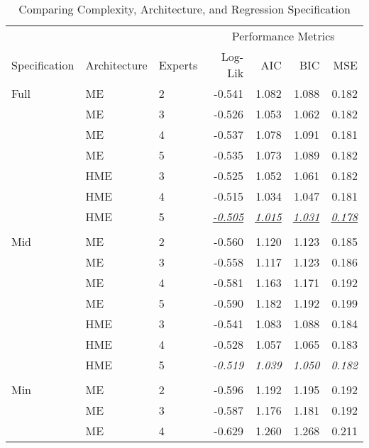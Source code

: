 \documentclass[12pt]{article}
\newcommand{\iu}[1]{\underline{\textit{#1}}}
\begin{document}
\begin{table} \centering
  \caption{Comparing Complexity, Architecture, and Regression Specification}
  \begin{threeparttable}
    {\footnotesize
    \begin{tabular}[r]{l l l r r r r}
  \cmidrule{1-7}
         &       &         &  \multicolumn{4}{c}{Performance Metrics} \\ 
   \cmidrule(l){4-7}
Specification & Architecture  & Experts & Log-Lik & AIC    & BIC    & MSE   \\ 
  \cmidrule{1-7}

Full     &  ME   &    2    & -0.541  & 1.082  & 1.088  & 0.182 \\
         &  ME   &    3    & -0.526  & 1.053  & 1.062  & 0.182 \\
         &  ME   &    4    & -0.537  & 1.078  & 1.091  & 0.181 \\
         &  ME   &    5    & -0.535  & 1.073  & 1.089  & 0.182 \\
         &  HME  &    3    & -0.525  & 1.052  & 1.061  & 0.182 \\
         &  HME  &    4    & -0.515  & 1.034  & 1.047  & 0.181 \\
         &  HME  &    5    & \iu{-0.505}  & \iu{1.015}  & \iu{1.031}  & \iu{0.178} \\
         &       &         &         &        &        &       \\
Mid      &  ME   &    2    & -0.560  & 1.120  & 1.123  & 0.185 \\
         &  ME   &    3    & -0.558  & 1.117  & 1.123  & 0.186 \\
         &  ME   &    4    & -0.581  & 1.163  & 1.171  & 0.192 \\
         &  ME   &    5    & -0.590  & 1.182  & 1.192  & 0.199 \\
         &  HME  &    3    & -0.541  & 1.083  & 1.088  & 0.184 \\
         &  HME  &    4    & -0.528  & 1.057  & 1.065  & 0.183 \\
         &  HME  &    5    & \it{-0.519}  & \it{1.039} & \it{1.050}  & \it{0.182} \\
         &       &         &         &        &        &       \\
Min      &  ME   &    2    & -0.596  & 1.192  & 1.195  & 0.192 \\
         &  ME   &    3    & -0.587  & 1.176  & 1.181  & 0.192 \\
         &  ME   &    4    & -0.629  & 1.260  & 1.268  & 0.211 \\

\end{tabular}}
\end{threeparttable}
\end{table}
\end{document}

